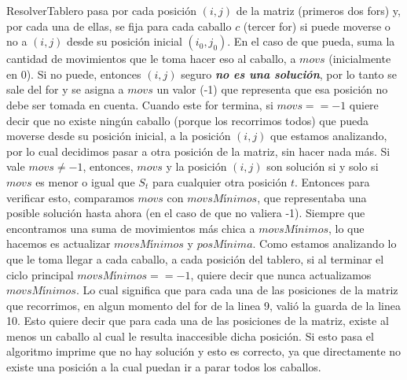 \documentclass[a4paper]{article}
\begin{document}
\newline ResolverTablero pasa por cada posición $(i, j)$ de la matriz (primeros dos fors) y, por cada una de ellas, se fija para cada caballo $c$ (tercer for) si puede moverse o no a $(i, j)$ desde su posición inicial $(i_0, j_0)$. En el caso de que pueda, suma la cantidad de movimientos que le toma hacer eso al caballo, a $movs$ (inicialmente en 0). Si no puede, entonces $(i, j)$ seguro \textit{\textbf{no es una solución}}, por lo tanto se sale del for y se asigna a $movs$ un valor (-1) que representa que esa posición no debe ser tomada en cuenta. Cuando este for termina, si $movs == -1$ quiere decir que no existe ningún caballo (porque los recorrimos todos) que pueda moverse desde su posición inicial, a la posición $(i, j)$ que estamos analizando, por lo cual decidimos pasar a otra posición de la matriz, sin hacer nada más. Si vale $movs \neq -1$, entonces, $movs$ y la posición $(i, j)$ son solución si y solo si $movs$ es menor o igual que $S_t$ para cualquier otra posición $t$. Entonces para verificar esto, comparamos $movs$ con $movsM$í$nimos$, que representaba una posible solución hasta ahora (en el caso de que no valiera -1). Siempre que encontramos una suma de movimientos más chica a $movsM$í$nimos$, lo que hacemos es actualizar $movsM$í$nimos$ y $posM$í$nima$. Como estamos analizando lo que le toma llegar a cada caballo, a cada posición del tablero, si al terminar el ciclo principal $movsM$í$nimos == -1$, quiere decir que nunca actualizamos $movsM$í$nimos$. Lo cual significa que para cada una de las posiciones de la matriz que recorrimos, en algun momento del for de la linea 9, valió la guarda de la linea 10. Esto quiere decir que para cada una de las posiciones de la matriz, existe al menos un caballo al cual le resulta inaccesible dicha posición. Si esto pasa el algoritmo imprime que no hay solución y esto es correcto, ya que directamente no existe una posición a la cual puedan ir a parar todos los caballos.
\end{document}
